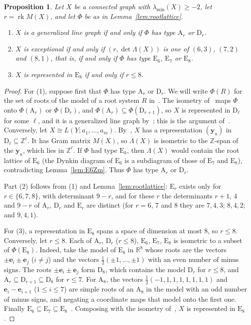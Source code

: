 \documentclass[11pt]{article}
\newcommand\ints{{\mathbb Z}}
\newcommand\re{{\mathbb R}}%
\newcommand\Zy{{\mathbf y}}
\newcommand\opk[1]{\mathop{\mathrm{#1}}\nolimits}
\newcommand\sbs{\subseteq}
\newcommand\rk{\opk{rk}}
\newtheorem{proposition}[theorem]{Proposition}
\theoremstyle{definition}
\newcommand{\typ}[1]{\mathrm{#1}}
\newcommand{\lmin}{\lambda_{\min}}
\newcommand\Ze{{\mathbf e}}
\begin{document}
\begin{proposition}\label{prop:types}
Let $X$ be a connected graph with $\lmin(X)\ge-2$, let $r=\rk M(X)$, and let $\Phi$ be as in
Lemma~\ref{lem:rootlattice}.
\begin{enumerate}
\item $X$ is a generalized line graph if and only if $\Phi$ has type $\typ A_r$ or $\typ D_r$.
\item $X$ is exceptional if and only if $(r,\det\Lambda(X))$ is one of $(6,3)$, $(7,2)$ and
$(8,1)$, that is, if and only if $\Phi$ has type $\typ E_6$, $\typ E_7$ or $\typ E_8$.
\item $X$ is represented in $\typ E_8$ if and only if $r\le8$.
\end{enumerate}
\end{proposition}

\begin{proof}
For (1), suppose first that $\Phi$ has type $\typ A_r$ or $\typ D_r$. We will write $\Phi(R)$ for
the set of roots of the model of a root system $R$ in~\cite[\S3]{CGSS}. The isometry of~\cite[Theorem~3.5]{CGSS} maps $\Phi$ onto $\Phi(\typ A_r)$ or $\Phi(\typ D_r)$, and
$\Phi(\typ A_r)\sbs\Phi(\typ D_{r+1})$, so $X$ is represented in $\typ D_\ell$ for some $\ell$,
and it is a generalized line graph by~\cite[Theorem~4.2]{CGSS}; this is the argument of~\cite[Theorem~4.10]{CGSS}. Conversely, let $X\cong L(Y;a_1,\dots,a_m)$. By~\cite[Theorem~4.2]{CGSS}, $X$ has a
representation $(\Zy_u)$ in $\typ D_\ell\sbs\ints^\ell$. It has Gram matrix $M(X)$, so $\Lambda(X)$ is
isometric to the $\ints$-span of the $\Zy_u$, which lies in $\ints^\ell$. If $\Phi$ had type
$\typ E_k$, then $\Lambda(X)$ would contain the root lattice of $\typ E_6$ (the Dynkin diagram of
$\typ E_6$ is a subdiagram of those of $\typ E_7$ and $\typ E_8$), contradicting
Lemma~\ref{lem:E6Zm}. Thus $\Phi$ has type $\typ A_r$ or $\typ D_r$.

Part (2) follows from (1) and Lemma~\ref{lem:rootlattice}: $\typ E_r$ exists only for
$r\in\{6,7,8\}$, with determinant $9-r$, and for these $r$ the determinants $r+1$, $4$ and $9-r$
of $\typ A_r$, $\typ D_r$ and $\typ E_r$ are distinct (for $r=6$, $7$ and $8$ they are $7,4,3$;
$8,4,2$; and $9,4,1$).

For (3), a representation in $\typ E_8$ spans a space of dimension at most $8$, so $r\le8$.
Conversely, let $r\le8$. Each of $\typ A_r$, $\typ D_r$ ($r\le8$), $\typ E_6$, $\typ E_7$,
$\typ E_8$ is isometric to a subset of $\Phi(\typ E_8)$. Indeed, take the model of $\typ E_8$ in
$\re^8$ whose roots are the vectors $\pm\Ze_i\pm\Ze_j$ ($i\ne j$) and the vectors
$\tfrac12(\pm1,\dots,\pm1)$ with an even number of minus signs. The roots $\pm\Ze_i\pm\Ze_j$ form
$\typ D_8$, which contains the model $\typ D_r$ for $r\le8$, and
$\typ A_r\sbs\typ D_{r+1}\sbs\typ D_8$ for $r\le7$. For $\typ A_8$, the vectors
$\tfrac12(-1,1,1,1,1,1,1,1)$ and $\Ze_i-\Ze_{i+1}$ ($1\le i\le7$) are simple roots of an
$\typ A_8$ in the model with an odd number of minus signs, and negating a coordinate maps that
model onto the first one. Finally $\typ E_6\sbs\typ E_7\sbs\typ E_8$~\cite[\S3]{CGSS}. Composing with
the isometry of~\cite[Theorem~3.5]{CGSS}, $X$ is represented in $\typ E_8$.
\end{proof}
\end{document}
